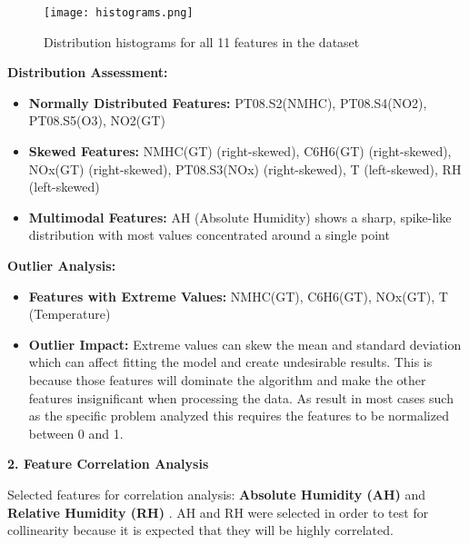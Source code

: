 \documentclass{article}
\begin{document}
\begin{figure}[h!]
    \centering
    \texttt{[image: histograms.png]}
    \caption{Distribution histograms for all 11 features in the dataset}
    \label{fig:histograms}
\end{figure}
\vspace{3cm}
\textbf{Distribution Assessment:}
\begin{itemize}
    \item \textbf{Normally Distributed Features:} PT08.S2(NMHC), PT08.S4(NO2), PT08.S5(O3), NO2(GT)
    \item \textbf{Skewed Features:} NMHC(GT) (right-skewed), C6H6(GT) (right-skewed), NOx(GT) (right-skewed), PT08.S3(NOx) (right-skewed), T (left-skewed), RH (left-skewed)
    \item \textbf{Multimodal Features:} AH (Absolute Humidity) shows a sharp, spike-like distribution with most values concentrated around a single point
\end{itemize}




\textbf{Outlier Analysis:}
\begin{itemize}
    \item \textbf{Features with Extreme Values:} NMHC(GT), C6H6(GT), NOx(GT), T (Temperature)
    \item \textbf{Outlier Impact:} Extreme values can skew the mean and standard deviation which can affect fitting the model and create undesirable results. This is because those features will dominate the algorithm and make the other 
    features insignificant when processing the data. As result in most cases such as the specific problem analyzed this requires the features to be normalized between 0 and 1. 
\end{itemize}



\textbf{2. Feature Correlation Analysis}



Selected features for correlation analysis: \textbf{Absolute Humidity (AH) } and \textbf{Relative Humidity (RH) }.
\newline
AH and RH were selected in order to test for collinearity because it is expected that they will be highly correlated. 
\end{document}
